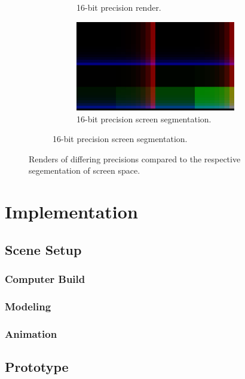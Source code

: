 \documentclass[conference]{IEEEtran}
\begin{document}
\begin{figure}[htbp]
\begin{subfigure}{\textwidth}
\begin{subfigure}{.49\textwidth}
      \caption{16-bit precision render.}
      \label{fig:render_8}
    \end{subfigure}
    \begin{subfigure}{.49\textwidth}
      \centering
      \includegraphics[width=\linewidth]{16_partition.jpg}
      \caption{16-bit precision screen segmentation.}
      \label{fig:render_8}
    \end{subfigure}
  \label{fig:render_16}
\end{subfigure}
\caption{Renders of differing precisions compared to the respective segementation of screen space.}
\label{fig:render_comparisons}
\end{figure}

\section{Implementation}

\subsection{Scene Setup}

\subsubsection{Computer Build}

\subsubsection{Modeling}

\subsubsection{Animation}

\subsection{Prototype}
\end{document}
